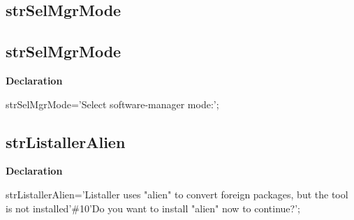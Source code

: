 \documentclass{report}
\newif\ifpdf
\begin{document}
\subsection*{\large{\textbf{strSelMgrMode}}\normalsize\hspace{1ex}\hrulefill}
\else
\subsection*{strSelMgrMode}
\fi
\label{trstrings-strSelMgrMode}
\begin{list}{}{
\setlength{\itemindent}{0cm}
\setlength{\listparindent}{0cm}
\setlength{\leftmargin}{\evensidemargin}
\addtolength{\leftmargin}{\tmplength}
\settowidth{\labelsep}{X}
\addtolength{\leftmargin}{\labelsep}
\setlength{\labelwidth}{\tmplength}
}
\item[\textbf{Declaration}\hfill]
\ifpdf
\begin{flushleft}
\fi
\begin{ttfamily}
strSelMgrMode='Select software-manager mode:';\end{ttfamily}

\ifpdf
\end{flushleft}
\fi

\end{list}
\ifpdf
\subsection*{\large{\textbf{strListallerAlien}}\normalsize\hspace{1ex}\hrulefill}
\else
\subsection*{strListallerAlien}
\fi
\label{trstrings-strListallerAlien}
\begin{list}{}{
\setlength{\itemindent}{0cm}
\setlength{\listparindent}{0cm}
\setlength{\leftmargin}{\evensidemargin}
\addtolength{\leftmargin}{\tmplength}
\settowidth{\labelsep}{X}
\addtolength{\leftmargin}{\labelsep}
\setlength{\labelwidth}{\tmplength}
}
\item[\textbf{Declaration}\hfill]
\ifpdf
\begin{flushleft}
\fi
\begin{ttfamily}
strListallerAlien='Listaller uses "alien" to convert foreign packages, but the tool is not installed'{\#}10'Do you want to install "alien" now to continue?';\end{ttfamily}

\ifpdf
\end{flushleft}
\fi

\end{list}
\ifpdf
\end{document}
